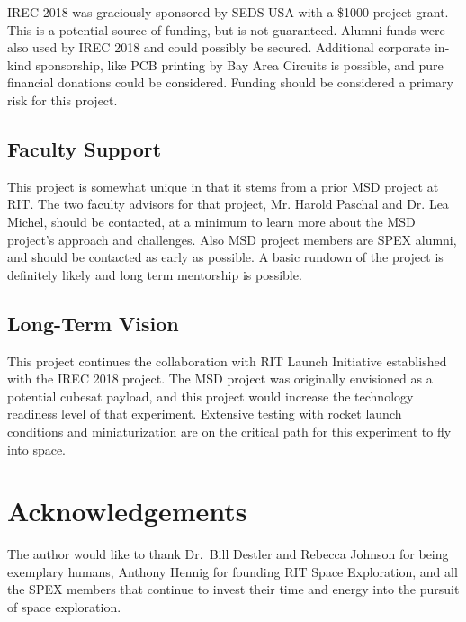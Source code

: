 \documentclass[conference]{IEEEtran} %
\begin{document}
IREC 2018 was graciously sponsored by SEDS USA with a \$1000 project grant. This is a potential source of funding, but is not guaranteed. Alumni funds were also used by IREC 2018 and could possibly be secured. Additional corporate in-kind sponsorship, like PCB printing by Bay Area Circuits is possible, and pure financial donations could be considered. Funding should be considered a primary risk for this project.

\subsection{Faculty Support}
This project is somewhat unique in that it stems from a prior MSD project at RIT. The two faculty advisors for that project, Mr. Harold Paschal and Dr. Lea Michel, should be contacted, at a minimum to learn more about the MSD project's approach and challenges. Also MSD project members are SPEX alumni, and should be contacted as early as possible. A basic rundown of the project is definitely likely and long term mentorship is possible.

\subsection{Long-Term Vision}
\label{sec:vision}
This project continues the collaboration with RIT Launch Initiative established with the IREC 2018 project. The MSD project was originally envisioned as a potential cubesat payload, and this project would increase the technology readiness level of that experiment. Extensive testing with rocket launch conditions and miniaturization are on the critical path for this experiment to fly into space.

\section*{Acknowledgements}
The author would like to thank Dr.~Bill Destler and Rebecca Johnson for being exemplary humans, Anthony Hennig for founding RIT Space Exploration, and all the SPEX members that continue to invest their time and energy into the pursuit of space exploration.



\end{document}
